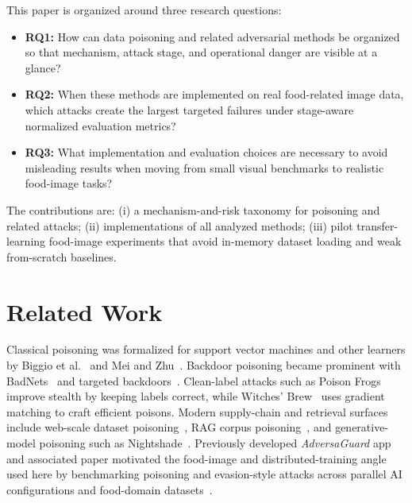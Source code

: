 \documentclass[conference]{IEEEtran}
\begin{document}
This paper is organized around three research questions:
\begin{itemize}
    \item \textbf{RQ1:} How can data poisoning and related adversarial methods be organized so that mechanism, attack stage, and operational danger are visible at a glance?
    \item \textbf{RQ2:} When these methods are implemented on real food-related image data, which attacks create the largest targeted failures under stage-aware normalized evaluation metrics?
    \item \textbf{RQ3:} What implementation and evaluation choices are necessary to avoid misleading results when moving from small visual benchmarks to realistic food-image tasks?
\end{itemize}

The contributions are: (i) a mechanism-and-risk taxonomy for poisoning and related attacks; (ii) implementations of all analyzed methods; (iii) pilot transfer-learning food-image experiments that avoid in-memory dataset loading and weak from-scratch baselines.

\section{Related Work}

Classical poisoning was formalized for support vector machines and other learners by Biggio et al.~\cite{biggio2012} and Mei and Zhu~\cite{mei2015}. Backdoor poisoning became prominent with BadNets~\cite{badnets} and targeted backdoors~\cite{targetedbackdoor}. Clean-label attacks such as Poison Frogs~\cite{poisonfrogs} improve stealth by keeping labels correct, while Witches' Brew~\cite{witchesbrew} uses gradient matching to craft efficient poisons. Modern supply-chain and retrieval surfaces include web-scale dataset poisoning~\cite{webscale}, RAG corpus poisoning~\cite{poisonedrag}, and generative-model poisoning such as Nightshade~\cite{nightshade}. Previously developed   \emph{AdversaGuard} app and associated paper motivated the food-image and distributed-training angle used here by benchmarking poisoning and evasion-style attacks across parallel AI configurations and food-domain datasets~\cite{adversaguard}.
\end{document}

